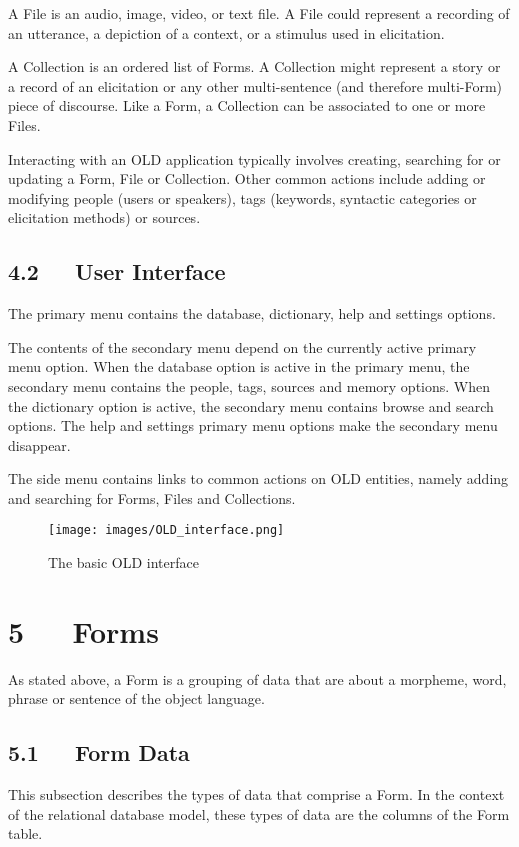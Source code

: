 \documentclass[letterpaper,10pt,english]{sphinxmanual}
\begin{document}
A File is an audio, image, video, or text file.  A File could represent a
recording of an utterance, a depiction of a context, or a stimulus used in
elicitation.

A Collection is an ordered list of Forms.  A Collection might represent a story
or a record of an elicitation or any other multi-sentence (and therefore
multi-Form) piece of discourse.  Like a Form, a Collection can be associated
to one or more Files.

Interacting with an OLD application typically involves creating, searching for
or updating a Form, File or Collection.  Other common actions include adding or
modifying people (users or speakers), tags (keywords, syntactic categories or
elicitation methods) or sources.


\section{4.2   User Interface}
\label{documentation:user-interface}
The primary menu contains the database, dictionary, help and settings options.

The contents of the secondary menu depend on the currently active primary menu
option.  When the database option is active in the primary menu, the secondary
menu contains the people, tags, sources and memory options.  When the dictionary
option is active, the secondary menu contains browse and search options.  The
help and settings primary menu options make the secondary menu disappear.

The side menu contains links to common actions on OLD entities, namely adding
and searching for Forms, Files and Collections.
\begin{figure}[htbp]
\centering
\capstart

\texttt{[image: images/OLD\_interface.png]}
\caption{The basic OLD interface}\end{figure}


\chapter{5   Forms}
\label{documentation:forms}
As stated above, a Form is a grouping of data that are about a morpheme, word,
phrase or sentence of the object language.


\section{5.1   Form Data}
\label{documentation:form-data}
This subsection describes the types of data that comprise a Form.  In the
context of the relational database model, these types of data are the columns of
the Form table.
\end{document}
